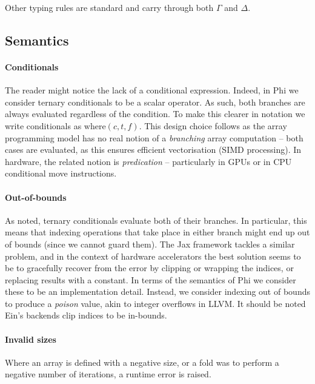 Other typing rules are standard and carry through both $\Gamma$ and $\Delta$.

\subsection{Semantics}

\paragraph{Conditionals} The reader might notice the lack of a conditional expression. Indeed, in Phi we consider ternary conditionals to be a scalar operator. As such, both branches are always evaluated regardless of the condition. To make this clearer in notation we write conditionals as $\mathrm{where}(c, t, f)$. This design choice follows as the array programming model has no real notion of a \textit{branching} array computation -- both cases are evaluated, as this ensures efficient vectorisation (SIMD processing). In hardware, the related notion is \textit{predication} -- particularly in GPUs or in CPU conditional move instructions.

\paragraph{Out-of-bounds} As noted, ternary conditionals evaluate both of their branches. In particular, this means that indexing operations that take place in either branch might end up out of bounds (since we cannot guard them). 
The Jax framework tackles a similar problem, and in the context of hardware accelerators the best solution seems to be to gracefully recover from the error by clipping or wrapping the indices, or replacing results with a constant. 
In terms of the semantics of Phi we consider these to be an implementation detail. Instead, we consider indexing out of bounds to produce a \textit{poison} value, akin to integer overflows in LLVM. It should be noted Ein's backends clip indices to be in-bounds.

\paragraph{Invalid sizes} Where an array is defined with a negative size, or a fold was to perform a negative number of iterations, a runtime error is raised. 


